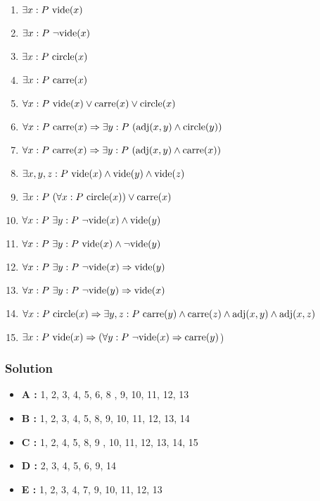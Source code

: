 \begin{enumerate}
  \item $\exists x : P \ \t{vide}(x)$
  \item $\exists x : P \ \neg \text{vide}(x)$
  \item $\exists x : P \ \t{circle}(x)$
  \item $\exists x : P \ \t{carre}(x)$
  \item $\forall x : P \ \text{vide}(x) \vee \text{carre}(x) \vee \text{circle}(x)$
  \item $\forall x : P \ \text{carre}(x) \Rightarrow \exists y : P \ (\text{adj}(x, y) \land \text{circle}(y))$
  \item $\forall x : P \ \text{carre}(x) \Rightarrow \exists y : P \ (\text{adj}(x, y) \land \text{carre}(x))$
  \item $\exists x, y, z : P \ \text{vide}(x) \land \text{vide}(y) \land \text{vide}(z)$
  \item $\exists x : P \ (\forall x : P \ \t{circle}(x)) \vee \t{carre}(x)$
  \item $\forall x : P \ \exists y : P \ \neg \text{vide}(x) \land \text{vide}(y)$
  \item $\forall x : P \ \exists y : P \ \t{vide}(x) \land \neg \t{vide}(y)$
  \item $\forall x : P \ \exists y : P \ \neg \text{vide}(x) \Rightarrow \text{vide}(y)$
  \item $\forall x : P \ \exists y : P \ \neg \text{vide}(y) \Rightarrow \text{vide}(x)$
  \item $\forall x : P \ \text{circle}(x) \Rightarrow \exists y, z : P \ \text{carre}(y) \land \text{carre}(z) \land \text{adj}(x, y) \land \text{adj}(x, z)$
  \item $\exists x : P \ \text{vide}(x) \Rightarrow (\forall y : P \ \neg \text{vide}(x) \Rightarrow \text{carre}(y)$)
 \end{enumerate}

    \subsubsection*{Solution}

    \begin{itemize}
        \item \textbf{A :} 1, 2, 3, 4, 5, 6, 8 , 9, 10, 11, 12, 13
        \item \textbf{B :} 1, 2, 3, 4, 5, 8, 9, 10, 11, 12, 13, 14
        \item \textbf{C :} 1, 2, 4, 5, 8, 9 , 10, 11, 12, 13, 14, 15
        \item \textbf{D :} 2, 3, 4, 5, 6, 9, 14
        \item \textbf{E :} 1, 2, 3, 4, 7, 9, 10, 11, 12, 13
    \end{itemize}

